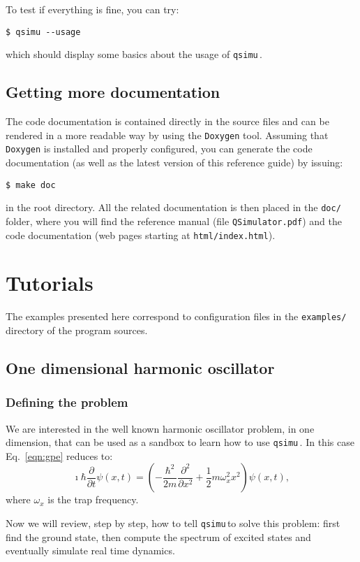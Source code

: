 \documentclass[12pt,a4paper]{report}
\newcommand{\qsimu}{\texttt{qsimu}\,}
\begin{document}
To test if everything is fine, you can try:
\begin{verbatim}
$ qsimu --usage
\end{verbatim}
which should display some basics about the usage of \qsimu.

\subsection{\label{sec:doc}Getting more documentation}
The code documentation is contained directly in the source files and can be rendered in a more readable way by using the \texttt{Doxygen} tool.
Assuming that \texttt{Doxygen} is installed and properly configured, you can generate the code documentation (as well as the latest version of this reference guide) by issuing:
\begin{verbatim}
$ make doc
\end{verbatim}
in the root directory.
All the related documentation is then placed in the \texttt{doc/} folder, where you will find the reference manual (file \texttt{QSimulator.pdf}) and the code documentation (web pages starting at \texttt{html/index.html}).

\section{Tutorials}
The examples presented here correspond to configuration files in the \texttt{examples/} directory of the program sources.

\subsection{One dimensional harmonic oscillator}
\subsubsection{Defining the problem}
We are interested in the well known harmonic oscillator problem, in one dimension, that can be used as a sandbox to learn how to use \qsimu. 
In this case Eq.~\eqref{eqn:gpe} reduces to:
\begin{equation}
\imath\hbar\frac{\partial}{\partial t}\psi(x,t)=\left(-\frac{\hbar^2}{2m}\frac{\partial^2}{\partial x^2}+\frac{1}{2}m\omega_x^2 x^2\right)\psi(x,t),
\label{eqn:1dho}
\end{equation}
where $\omega_x$ is the trap frequency.

Now we will review, step by step, how to tell \qsimu to solve this problem: first find the ground state, then compute the spectrum of excited states and eventually simulate real time dynamics.
\end{document}
